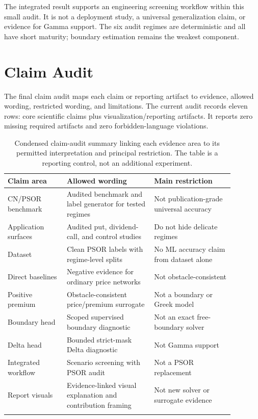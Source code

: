\documentclass[11pt]{article}
\begin{document}
The integrated result supports an engineering screening workflow within this
small audit. It is not a deployment study, a universal generalization claim, or
evidence for Gamma support. The six audit regimes are deterministic and all
have short maturity; boundary estimation remains the weakest component.

\section{Claim Audit}
The final claim audit maps each claim or reporting artifact to evidence, allowed wording, restricted wording, and limitations. The current audit records eleven rows: core scientific claims plus visualization/reporting artifacts. It reports zero missing required artifacts and zero forbidden-language violations.

\begin{longtable}{p{0.23\linewidth}p{0.34\linewidth}p{0.31\linewidth}}
\toprule
Claim area & Allowed wording & Main restriction \\
\midrule
CN/PSOR benchmark & Audited benchmark and label generator for tested regimes & Not publication-grade universal accuracy \\
Application surfaces & Audited put, dividend-call, and control studies & Do not hide delicate regimes \\
Dataset & Clean PSOR labels with regime-level splits & No ML accuracy claim from dataset alone \\
Direct baselines & Negative evidence for ordinary price networks & Not obstacle-consistent \\
Positive premium & Obstacle-consistent price/premium surrogate & Not a boundary or Greek model \\
Boundary head & Scoped supervised boundary diagnostic & Not an exact free-boundary solver \\
Delta head & Bounded strict-mask Delta diagnostic & Not Gamma support \\
Integrated workflow & Scenario screening with PSOR audit & Not a PSOR replacement \\
Report visuals & Evidence-linked visual explanation and contribution framing & Not new solver or surrogate evidence \\
\bottomrule
\caption{Condensed claim-audit summary linking each evidence area to its permitted interpretation and principal restriction. The table is a reporting control, not an additional experiment.}
\label{tab:claims}
\end{longtable}
\end{document}
